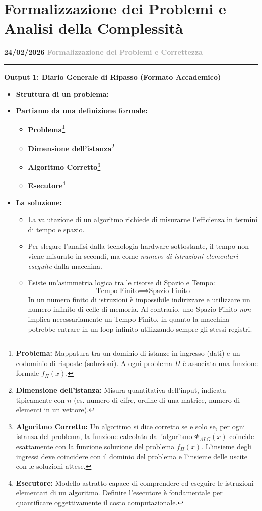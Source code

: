 \documentclass[a4paper, 11pt]{report}
\newcommand{\lezione}[2]{
\vspace{2em}
\noindent\textbf{\Large #1 \hfill \textcolor{darkgray}{#2}}
\vspace{0.5em}
\hrule
\vspace{1.5em}
}
\newcommand{\definizione}[2]{%
\textbf{#1}\footnote{\textbf{#1:} #2}%
}
\begin{document}
\chapter{Formalizzazione dei Problemi e Analisi della Complessità}

\lezione{24/02/2026}{Formalizzazione dei Problemi e Correttezza}
\vspace{0.5cm}
\textbf{Output 1: Diario Generale di Ripasso (Formato Accademico)}
\begin{itemize}
\item \textbf{Struttura di un problema:}
\item \textbf{Partiamo da una definizione formale:}
\begin{itemize}
\item \definizione{Problema}{Mappatura tra un dominio di istanze in ingresso (dati) e un codominio di risposte (soluzioni). A ogni problema $\Pi$ è associata una funzione formale $f_{\Pi}(x)$.}
\item \definizione{Dimensione dell'istanza}{Misura quantitativa dell'input, indicata tipicamente con $n$ (es. numero di cifre, ordine di una matrice, numero di elementi in un vettore).}
\item \definizione{Algoritmo Corretto}{Un algoritmo si dice corretto se e solo se, per ogni istanza del problema, la funzione calcolata dall'algoritmo $\Phi_{ALG}(x)$ coincide esattamente con la funzione soluzione del problema $f_{\Pi}(x)$. L'insieme degli ingressi deve coincidere con il dominio del problema e l'insieme delle uscite con le soluzioni attese.}
\item \definizione{Esecutore}{Modello astratto capace di comprendere ed eseguire le istruzioni elementari di un algoritmo. Definire l'esecutore è fondamentale per quantificare oggettivamente il costo computazionale.}
\end{itemize}
\item \textbf{La soluzione:}
\begin{itemize}
\item La valutazione di un algoritmo richiede di misurarne l'efficienza in termini di tempo e spazio.
\item Per slegare l'analisi dalla tecnologia hardware sottostante, il tempo non viene misurato in secondi, ma come \textit{numero di istruzioni elementari eseguite} dalla macchina.
\item Esiste un'asimmetria logica tra le risorse di Spazio e Tempo:
\begin{equation*}
\text{Tempo Finito} \implies \text{Spazio Finito}
\end{equation*}
In un numero finito di istruzioni è impossibile indirizzare e utilizzare un numero infinito di celle di memoria. Al contrario, uno Spazio Finito \textit{non} implica necessariamente un Tempo Finito, in quanto la macchina potrebbe entrare in un loop infinito utilizzando sempre gli stessi registri.
\end{itemize}
\end{itemize}
\end{document}
